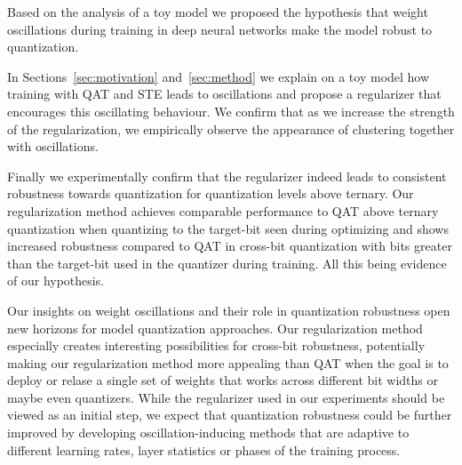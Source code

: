 Based on the analysis of a toy model we proposed the hypothesis that weight oscillations during training in deep neural networks make the model robust to quantization. 


In Sections~\ref{sec:motivation} and~\ref{sec:method} we explain on a toy model how training with QAT and STE leads to oscillations and propose a regularizer that encourages this oscillating behaviour. We confirm that as we increase the strength of the regularization, we empirically observe the appearance of clustering together with oscillations. 

Finally we experimentally confirm that the regularizer indeed leads to consistent robustness towards quantization for quantization levels above ternary. Our regularization method achieves comparable performance to QAT above ternary quantization when quantizing to the target-bit seen during optimizing and shows increased robustness compared to QAT in cross-bit quantization with bits greater than the target-bit used in the quantizer during training. All this being evidence of our hypothesis.

Our insights on weight oscillations and their role in quantization robustness open new horizons for model quantization approaches. Our regularization method especially creates interesting possibilities for cross-bit robustness, potentially making our regularization method more appealing than QAT when the goal is to deploy or relase a single set of weights that works across different bit widths or maybe even quantizers. While the regularizer used in our experiments should be viewed as an initial step, we expect that quantization robustness could be further improved by developing oscillation-inducing methods that are adaptive to different learning rates, layer statistics or phases of the training process.


